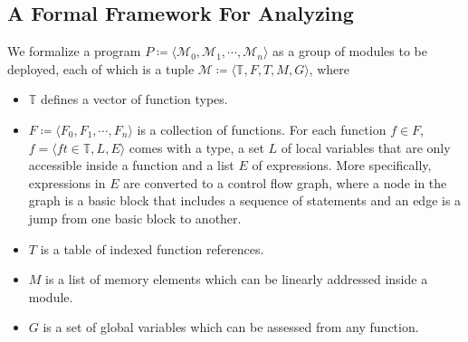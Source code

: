 
\subsection{A Formal Framework For Analyzing \wasm}
\label{subsec:formal}
We formalize a \wasm program $P \coloneqq \langle \mathcal{M}_0, \mathcal{M}_1, \cdots, \mathcal{M}_n \rangle$ as a group of modules to be deployed, each of 
which is a tuple $\mathcal{M} \coloneqq \langle \mathbb{T}, F, T, M, G \rangle$, where 
\begin{itemize}[leftmargin=*]
\item $\mathbb{T}$ defines a vector of function types.

\item $F \coloneqq \langle F_0, F_1, \cdots, F_n \rangle$ is a collection of functions. For each function $f\in F$, 
$ f = \langle \textit{ft} \in \mathbb{T}, L, E\rangle$ comes with a type, a set $L$ of local variables 
that are only accessible inside a function and a list $E$ of expressions. More specifically, expressions in $E$ are 
converted to a control flow graph, where a node in the graph is a basic block that includes a sequence of 
\wasm statements and an edge is a jump from one basic block to another.
 
\item $T$ is a table of indexed function references.

\item $M$ is a list of memory elements which can be linearly addressed inside a module.

\item $G$ is a set of global variables which can be assessed from any function.
\end{itemize}

